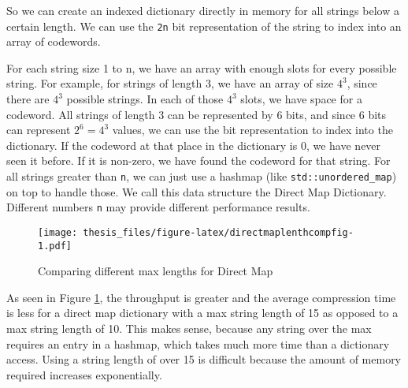 \documentclass[12pt,twoside]{reedthesis}
\begin{document}
So we can create an indexed dictionary directly in memory for all strings below a certain length. We can use the \texttt{2n} bit representation of the string
to index into an array of codewords.

For each string size 1 to n, we have an array with enough slots for every possible string. For example, for strings of length 3, we have an array of size \(4^3\), since there are \(4^3\) possible strings. In each of those \(4^3\) slots, we have space for a codeword. All strings of length 3 can be represented by 6 bits, and since 6 bits can represent \(2^6=4^3\) values, we can use the bit representation to index into the dictionary. If the codeword at that place in the dictionary is 0, we have never seen it before. If it is non-zero, we have found the codeword for that string. For all strings greater than \texttt{n}, we can just use a hashmap (like \texttt{std::unordered\_map}) on top to handle those. We call this data structure the Direct Map Dictionary. Different numbers \texttt{n} may provide different performance results.
\begin{figure}
\centering
\texttt{[image: thesis\_files/figure-latex/directmaplenthcompfig-1.pdf]}
\caption{\label{fig:directmaplenthcompfig}Comparing different max lengths for Direct Map}
\end{figure}
As seen in Figure \ref{fig:directmaplenthcompfig}, the throughput is greater and the average compression time is less for a direct map dictionary with a max string length of 15 as opposed to a max string length of 10. This makes sense, because any string over the max requires an entry in a hashmap, which takes much more time than a dictionary access. Using a string length of over 15 is difficult because the amount of memory required increases exponentially.
\end{document}
